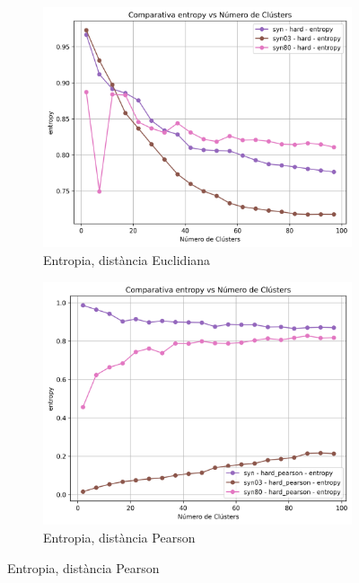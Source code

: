 \documentclass[a4paper,12pt]{report}
\begin{document}
\begin{figure}[H]
    \vspace{1em}

    \begin{subfigure}[b]{0.49\textwidth}
        \includegraphics[width=\textwidth]{Figuras/entropy-hard-sin.png}
        \caption{Entropia, distància Euclidiana}
        \label{fig:hard-clustering-sin-results-e}
    \end{subfigure}
    \hfill
    \begin{subfigure}[b]{0.49\textwidth}
        \includegraphics[width=\textwidth]{Figuras/entropy-hard_pearson-sin.png}
        \caption{Entropia, distància Pearson}
        \label{fig:hard-clustering-sin-results-f}
    \end{subfigure}


\end{figure}
\end{document}
